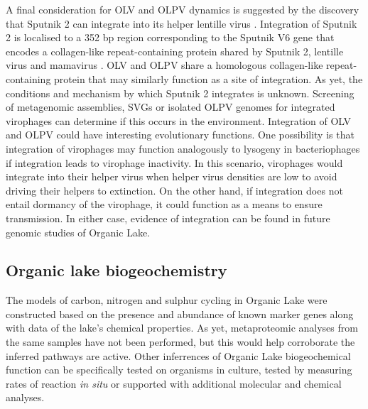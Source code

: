 A final consideration for \ac{OLV} and \ac{OLPV} dynamics is suggested by the discovery that Sputnik 2 can integrate into its helper lentille virus \cite{Desnues2012}.
Integration of Sputnik 2 is localised to a 352 bp region corresponding to the Sputnik V6 gene that encodes a collagen-like repeat-containing protein shared by Sputnik 2, lentille virus and mamavirus  \cite{Desnues2012}. 
\ac{OLV} and \ac{OLPV} share a homologous collagen-like repeat-containing protein that may similarly function as a site of integration.
As yet, the conditions and mechanism by which Sputnik 2 integrates is unknown.
Screening of metagenomic assemblies, \acp{SVG} or isolated \ac{OLPV} genomes for integrated virophages can determine if this occurs in the environment.
Integration of \ac{OLV} and \ac{OLPV} could have interesting evolutionary functions.
One possibility is that integration of virophages may function analogously to lysogeny in bacteriophages if integration leads to virophage inactivity.
In this scenario, virophages would integrate into their helper virus when helper virus densities are low to avoid driving their helpers to extinction.
On the other hand, if integration does not entail dormancy of the virophage, it could function as a means to ensure transmission.
In either case, evidence of integration can be found in future genomic studies of Organic Lake.

\subsection{Organic lake biogeochemistry}
The models of carbon, nitrogen and sulphur cycling in Organic Lake were constructed based on the presence and abundance of known marker genes  along with data of the lake's chemical properties.
As yet, metaproteomic analyses from the same samples have not been performed, but this would help corroborate the inferred pathways are active. 
Other inferrences of Organic Lake biogeochemical function can be specifically tested on organisms in culture, tested by measuring rates of reaction \emph{in situ} or supported with additional molecular and chemical analyses.

